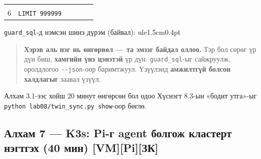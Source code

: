 \begin{longtable}[]{@{}llllll@{}}
\begin{minipage}[t]{0.14\columnwidth}
\end{minipage} & \begin{minipage}[t]{0.14\columnwidth}\raggedright
\strut
\end{minipage} & \begin{minipage}[t]{0.14\columnwidth}\raggedright
\strut
\end{minipage} & \begin{minipage}[t]{0.14\columnwidth}\raggedright
\strut
\end{minipage} & \begin{minipage}[t]{0.14\columnwidth}\raggedright
\strut
\end{minipage}\tabularnewline
\begin{minipage}[t]{0.14\columnwidth}\raggedright
6\strut
\end{minipage} & \begin{minipage}[t]{0.14\columnwidth}\raggedright
\texttt{LIMIT\ 999999}\strut
\end{minipage} & \begin{minipage}[t]{0.14\columnwidth}\raggedright
\strut
\end{minipage} & \begin{minipage}[t]{0.14\columnwidth}\raggedright
\strut
\end{minipage} & \begin{minipage}[t]{0.14\columnwidth}\raggedright
\strut
\end{minipage} & \begin{minipage}[t]{0.14\columnwidth}\raggedright
\strut
\end{minipage}\tabularnewline
\bottomrule
\end{longtable}\endgroup

\texttt{guard\_sql}-д нэмсэн шинэ дүрэм (байвал): ule{1.5cm}{0.4pt}

\begin{quote}
\textbf{Хэрэв аль нэг нь өнгөрвөл --- та эмзэг байдал оллоо.} Тэр бол сөрөг үр дүн биш, \textbf{хамгийн үнэ цэнэтэй} үр дүн. \texttt{guard\_sql}-ыг сайжруулж, оролдлогоо \texttt{-\/-json}-оор баримтжуул. Үзүүлэнд \textbf{амжилтгүй болсон халдлагыг} заавал үзүүл.
\end{quote}

Алхам 3.1-ээс хойш 20 минут өнгөрсөн бол одоо Хүснэгт 8.3-ын «бодит утга»-ыг \texttt{python\ lab08/\allowbreak{}twin\_\allowbreak{}sync.\allowbreak{}py\ show}-оор бөглө.

\hypertarget{ux430ux43bux445ux430ux43c-7-k3s-pi-ux433-agent-ux431ux43eux43bux433ux43eux436-ux43aux43bux430ux441ux442ux435ux440ux442-ux43dux44dux433ux442ux433ux44dux445-40-ux43cux438ux43d-vmpiux437ux43a}{%
\subsection{Алхам 7 --- K3s: Pi-г agent болгож кластерт нэгтгэх (40 мин) {[}VM{]}{[}Pi{]}{[}ЗК{]}}\label{ux430ux43bux445ux430ux43c-7-k3s-pi-ux433-agent-ux431ux43eux43bux433ux43eux436-ux43aux43bux430ux441ux442ux435ux440ux442-ux43dux44dux433ux442ux433ux44dux445-40-ux43cux438ux43d-vmpiux437ux43a}}

